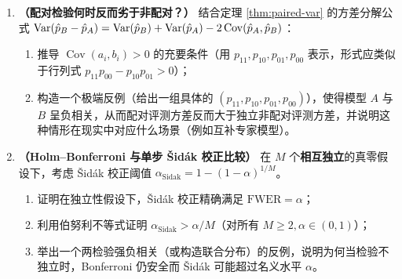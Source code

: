 \begin{enumerate}[label=\textbf{7.1.\arabic*}, start=3]
  \item \textbf{（配对检验何时反而劣于非配对？）} 结合定理 \ref{thm:paired-var} 的方差分解公式 $\operatorname{Var}(\hat{p}_B-\hat{p}_A) = \operatorname{Var}(\hat{p}_B)+\operatorname{Var}(\hat{p}_A)-2\operatorname{Cov}(\hat{p}_A,\hat{p}_B)$：
  \begin{enumerate}
    \item 推导 $\operatorname{Cov}(a_i, b_i) > 0$ 的充要条件（用 $p_{11}, p_{10}, p_{01}, p_{00}$ 表示，形式应类似于行列式 $p_{11}p_{00} - p_{10}p_{01} > 0$）；
    \item 构造一个极端反例（给出一组具体的 $(p_{11},p_{10},p_{01},p_{00})$），使得模型 $A$ 与 $B$ 呈负相关，从而配对评测方差反而大于独立非配对评测方差，并说明这种情形在现实中对应什么场景（例如互补专家模型）。
  \end{enumerate}

  \item \textbf{（Holm--Bonferroni 与单步 \v{S}id\'ak 校正比较）} 在 $M$ 个\textbf{相互独立}的真零假设下，考虑 \v{S}id\'ak 校正阈值 $\alpha_{\text{Sidak}} = 1 - (1-\alpha)^{1/M}$。
  \begin{enumerate}
    \item 证明在独立性假设下，\v{S}id\'ak 校正精确满足 $\mathrm{FWER} = \alpha$；
    \item 利用伯努利不等式证明 $\alpha_{\text{Sidak}} > \alpha / M$（对所有 $M \ge 2, \alpha \in (0,1)$）；
    \item 举出一个两检验强负相关（或构造联合分布）的反例，说明为何当检验不独立时，Bonferroni 仍安全而 \v{S}id\'ak 可能超过名义水平 $\alpha$。
  \end{enumerate}
\end{enumerate}


